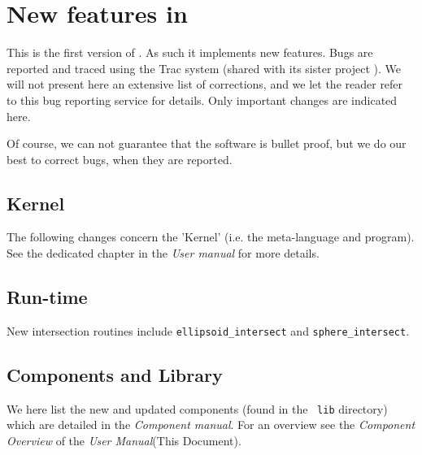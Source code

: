 
\chapter{New features in \MCX \version}
\label{c:changes}

This is the first version of \MCX. As such it implements new features. Bugs are
reported and traced using the \MCX Trac system \cite{mccode_trac_webpage}
(shared with its sister project \MCS). We will not present here an extensive
list of corrections, and we let the reader refer to this bug reporting service
for details. Only important changes are indicated here.

Of course, we can not guarantee that the software is bullet proof, but we do our best to correct bugs, when they are reported.


\section{Kernel}
\label{s:new-features:kernel}

The following changes concern the 'Kernel' (i.e. the \MCXx meta-language and program). See the dedicated chapter in the \textit{User manual} for more details.

\section{Run-time}
\label{s:new-features:run-time}
New intersection routines include \verb+ellipsoid_intersect+ and \verb+sphere_intersect+.


\section{Components and Library}
\label{s:new-features:components}
 
We here list the new and updated components (found in the \MCX\ \verb+lib+ directory)
which are detailed in the \textit{Component manual}. For an overview see the \textit{Component Overview} of the \textit{User Manual}(This Document).
